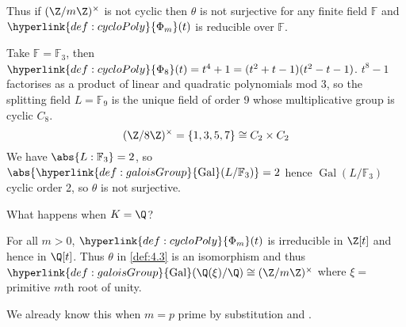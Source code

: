 \documentclass{article}
\DeclareMathOperator{\Gal}{Gal}
\newcommand{\F}{\mathbb{F}}
\begin{document}
\begin{remark}
    Thus if $(\Z/m\Z)^\times$ is not cyclic then $\theta$ is not surjective for any finite field $\F$ and $\hyperlink{def:cycloPoly}{\Phi_m}(t)$ is reducible over $\F$.
\end{remark}

\begin{eg}
    Take $\F = \F_3$, then $\hyperlink{def:cycloPoly}{\Phi_8}(t) = t^4 + 1 = (t^2+t-1)(t^2-t-1)$.
    $t^8 - 1$ factorises as a product of linear and quadratic polynomials mod 3, so the splitting field $L = \F_9$ is the unique field of order 9 whose multiplicative group is cyclic $C_8$.
    \begin{equation*}
        (\Z/8\Z)^\times = \{1,3,5,7\}\cong C_2 \times C_2
    \end{equation*}
    We have $\abs{L:\F_3} = 2$, so $\abs{\hyperlink{def:galoisGroup}{\Gal}(L/\F_3)}=2$ hence $\Gal(L/\F_3)$ cyclic order 2, so $\theta$ is not surjective.
\end{eg}

What happens when $K = \Q$?
\begin{nthm}\label{thm:4.8}
    For all $m > 0$, $\hyperlink{def:cycloPoly}{\Phi_m}(t)$ is irreducible in $\Z[t]$ and hence in $\Q[t]$.
    Thus $\theta$ in \cref{def:4.3} is an isomorphism and thus $\hyperlink{def:galoisGroup}{\Gal}(\Q(\xi)/\Q) \cong (\Z/m\Z)^\times$ where $\xi =$ primitive $m$th root of unity.
\end{nthm}

\begin{remark}
    We already know this when $m = p$ prime by substitution and .
\end{remark}
\end{document}
